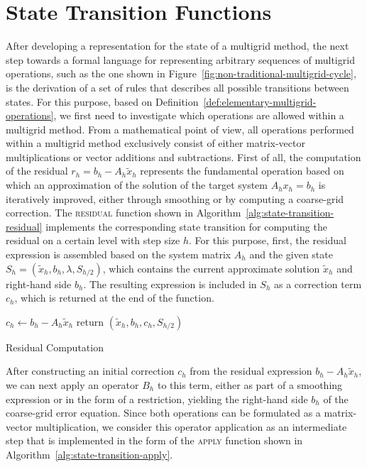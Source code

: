\section{State Transition Functions}
\label{sec:multigrid-state-transitions}
After developing a representation for the state of a multigrid method, the next step towards a formal language for representing arbitrary sequences of multigrid operations,
such as the one shown in Figure~\ref{fig:non-traditional-multigrid-cycle}, is the derivation of a set of rules that describes all possible transitions between states.
For this purpose, based on Definition~\ref{def:elementary-multigrid-operations}, we first need to investigate which operations are allowed within a multigrid method.
From a mathematical point of view, all operations performed within a multigrid method exclusively consist of either matrix-vector multiplications or vector additions and subtractions.
First of all, the computation of the residual $r_h = b_h - A_h \tilde{x}_h$ represents the fundamental operation based on which an approximation of the solution of the target system $A_h x_h = b_h$ is iteratively improved, either through smoothing or by computing a coarse-grid correction.
The \textsc{residual} function shown in Algorithm~\ref{alg:state-transition-residual} implements the corresponding state transition for computing the residual on a certain level with step size $h$.
For this purpose, first, the residual expression is assembled based on the system matrix $A_h$ and the given state $S_h = (\tilde{x}_h, b_h, \lambda, S_{h/2})$, which contains the current approximate solution $\tilde{x}_h$ and right-hand side $b_h$.
The resulting expression is included in $S_h$ as a correction term $c_h$, which is returned at the end of the function.
\begin{algorithm}
	\begin{algorithmic}
		\State $c_h \gets b_h - A_h \tilde{x}_h$
		\State return $(\tilde{x}_h, b_h, c_h, S_{h/2})$
		\EndFunction
	\end{algorithmic}
\caption{Residual Computation}
\label{alg:state-transition-residual}
\end{algorithm}
After constructing an initial correction $c_h$ from the residual expression $b_h - A_h \tilde{x}_h$, we can next apply an operator $B_h$ to this term, either as part of a smoothing expression or in the form of a restriction, yielding the right-hand side $b_h$ of the coarse-grid error equation.
Since both operations can be formulated as a matrix-vector multiplication, we consider this operator application as an intermediate step that is implemented in the form of the \textsc{apply} function shown in Algorithm~\ref{alg:state-transition-apply}.
